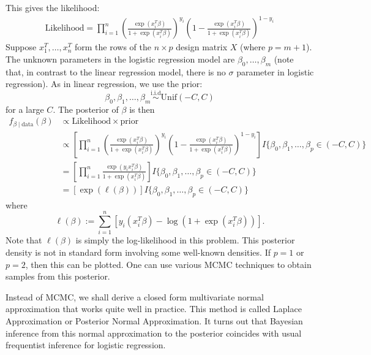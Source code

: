 \documentclass{scrartcl}
\begin{document}
  This gives the likelihood:
  \begin{align*}
  \text{Likelihood} =\prod_{i=1}^n \left(\frac{\exp
        \left(x_i^T\beta \right)}{1 + \exp \left(x_i^T\beta \right)}
    \right)^{y_i} \left(1 - \frac{\exp
        \left(x_i^T\beta \right)}{1 + \exp \left(x_i^T\beta \right)}
    \right)^{1-y_i} 
  \end{align*}
Suppose $x_1^T, \dots, x_n^T$ form the rows of the $n \times p$
  design matrix $X$ (where $p = m+1$). The unknown parameters in the
  logistic regression model are $\beta_0, \dots, \beta_m$ (note that,
  in contrast to the linear regression model, there is no $\sigma$
  parameter in logistic regression). As in linear regression, we use the prior: 
\begin{equation}\label{unilog}
\beta_0,  \beta_1, \dots, \beta_m \overset{\text{i.i.d}}{\sim} \text{Unif} (-C, C)
\end{equation}
  for a large $C$. The posterior of $\beta$ is then
  \begin{align*}
    f_{\beta \mid \text{data}}(\beta) &\propto \text{Likelihood} \times \text{prior} \\
    &\propto \left[\prod_{i=1}^n \left(\frac{\exp
        \left(x_i^T\beta \right)}{1 + \exp \left(x_i^T\beta \right)}
    \right)^{y_i} \left(1 - \frac{\exp
        \left(x_i^T\beta \right)}{1 + \exp \left(x_i^T\beta \right)}
    \right)^{1-y_i} \right] I\{\beta_0, \beta_1, \dots, \beta_p \in (-C, C)\}
    \\ &= \left[\prod_{i=1}^n \frac{\exp(y_ix_i^T\beta)
    }{1 + \exp(x_i^T\beta)} \right]I\{\beta_0, \beta_1, \dots, \beta_p
         \in (-C, C)\} \\
    &= \left[\exp \left(\ell(\beta) \right) \right]I\{\beta_0, \beta_1, \dots, \beta_p
         \in (-C, C)\}
  \end{align*}
  where
\begin{equation*}
  \ell(\beta) := \sum_{i=1}^n \left[ y_i (x_i^T\beta) - \log \left(1 +
    \exp(x_i^T \beta) \right) \right]. 
\end{equation*}
Note that $\ell(\beta)$ is simply the log-likelihood in this
problem. This posterior density is not in standard form involving some
well-known densities. If $p = 1$ or $p = 2$, 
then this can be plotted. One can use various MCMC techniques to
obtain samples from this posterior.

Instead of MCMC, we shall derive a closed form multivariate normal
approximation that works quite well in practice. This method is called
Laplace Approximation or Posterior Normal Approximation. It turns out
that Bayesian inference from this normal approximation to the
posterior coincides with usual frequentist inference for logistic
regression.
\end{document}
